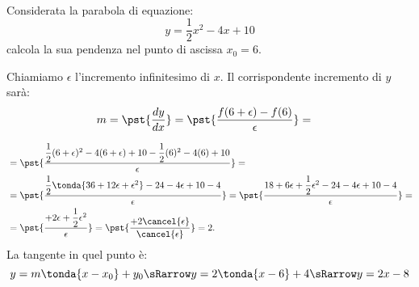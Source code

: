 \begin{esempio}
{~}

\begin{minipage}{.49\textwidth}
Considerata la parabola di equazione:
\[y=\dfrac{1}{2}x^2-4x+10\] 
calcola la sua pendenza nel punto di ascissa \(x_0=6\).

Chiamiamo \(\epsilon\) l'incremento infinitesimo di \(x\).
Il corrispondente incremento di \(y\) sarà: 
\begin{align*}
m&=\pst{\dfrac{d y}{d x}}=
\pst{\dfrac{f(6+\epsilon)-f(6)}{\epsilon}}=
\end{align*}
\end{minipage}
\hfill
\begin{minipage}{.49\textwidth}
\begin{center}\ipertangentea\end{center}
\end{minipage}
\begin{align*}
&=\pst{\dfrac{\dfrac{1}{2}(6+\epsilon)^2-4(6+\epsilon)+10
              -\dfrac{1}{2}(6)^2-4(6)+10}
             {\epsilon}}=\\
&=\pst{\dfrac{\dfrac{1}{2}\tonda{36+12\epsilon+\epsilon^2}-24-4\epsilon+10
              -4}
             {\epsilon}}=
   \pst{\dfrac{18+6\epsilon+\dfrac{1}{2}\epsilon^2-24-4\epsilon+10-4}
             {\epsilon}}=\\
 &=\pst{\dfrac{+2\epsilon+\dfrac{1}{2}\epsilon^2}{\epsilon}}=
   \pst{\dfrac{+2\cancel{\epsilon}}{\cancel{\epsilon}}}=2.
\end{align*}
La tangente in quel punto è:
\[y=m \tonda{x-x_0}+y_0 \sRarrow y=2 \tonda{x-6}+4 \sRarrow y=2x-8\]
\end{esempio}


